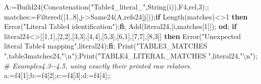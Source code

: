 \documentclass[
  10pt,
  letterpaper,
]{article}
\newenvironment{Shaded}{}{}
\newcommand{\BuiltInTok}[1]{\textcolor[rgb]{0.00,0.50,0.00}{#1}}
\newcommand{\CommentTok}[1]{\textcolor[rgb]{0.38,0.63,0.69}{\textit{#1}}}
\newcommand{\ControlFlowTok}[1]{\textcolor[rgb]{0.00,0.44,0.13}{\textbf{#1}}}
\newcommand{\FloatTok}[1]{\textcolor[rgb]{0.25,0.63,0.44}{#1}}
\newcommand{\NormalTok}[1]{#1}
\newcommand{\OperatorTok}[1]{\textcolor[rgb]{0.40,0.40,0.40}{#1}}
\newcommand{\StringTok}[1]{\textcolor[rgb]{0.25,0.44,0.63}{#1}}
\newcommand{\VariableTok}[1]{\textcolor[rgb]{0.10,0.09,0.49}{#1}}
\begin{document}
\begin{Shaded}
\begin{Highlighting}[]
 \VariableTok{A}\OperatorTok{:=}\VariableTok{Build24}\NormalTok{(}\BuiltInTok{Concatenation}\NormalTok{(}\StringTok{"Table4\_literal\_"}\OperatorTok{,}\BuiltInTok{String}\NormalTok{(}\VariableTok{i}\NormalTok{))}\OperatorTok{,}\VariableTok{F4}\OperatorTok{,}\VariableTok{rel}\OperatorTok{,}\FloatTok{3}\NormalTok{)}\OperatorTok{;;}
 \VariableTok{matches}\OperatorTok{:=}\BuiltInTok{Filtered}\NormalTok{([}\FloatTok{1}\OperatorTok{..}\FloatTok{8}\NormalTok{]}\OperatorTok{,}\VariableTok{j}\OperatorTok{{-}\textgreater{}}\VariableTok{Same24}\NormalTok{(}\VariableTok{A}\OperatorTok{,}\VariableTok{refs24}\NormalTok{[}\VariableTok{j}\NormalTok{]))}\OperatorTok{;}\ControlFlowTok{if} \BuiltInTok{Length}\NormalTok{(}\VariableTok{matches}\NormalTok{)}\OperatorTok{\textless{}\textgreater{}}\FloatTok{1} \ControlFlowTok{then} \BuiltInTok{Error}\NormalTok{(}\StringTok{"Literal Table4 identification"}\NormalTok{)}\OperatorTok{;}\ControlFlowTok{fi}\OperatorTok{;}
 \BuiltInTok{Add}\NormalTok{(}\VariableTok{literal24}\OperatorTok{,}\NormalTok{[}\VariableTok{i}\OperatorTok{,}\VariableTok{matches}\NormalTok{[}\FloatTok{1}\NormalTok{]])}\OperatorTok{;}
\ControlFlowTok{od}\OperatorTok{;}
\ControlFlowTok{if} \VariableTok{literal24}\OperatorTok{\textless{}\textgreater{}}\NormalTok{[[}\FloatTok{1}\OperatorTok{,}\FloatTok{1}\NormalTok{]}\OperatorTok{,}\NormalTok{[}\FloatTok{2}\OperatorTok{,}\FloatTok{2}\NormalTok{]}\OperatorTok{,}\NormalTok{[}\FloatTok{3}\OperatorTok{,}\FloatTok{3}\NormalTok{]}\OperatorTok{,}\NormalTok{[}\FloatTok{4}\OperatorTok{,}\FloatTok{4}\NormalTok{]}\OperatorTok{,}\NormalTok{[}\FloatTok{5}\OperatorTok{,}\FloatTok{3}\NormalTok{]}\OperatorTok{,}\NormalTok{[}\FloatTok{6}\OperatorTok{,}\FloatTok{1}\NormalTok{]}\OperatorTok{,}\NormalTok{[}\FloatTok{7}\OperatorTok{,}\FloatTok{7}\NormalTok{]}\OperatorTok{,}\NormalTok{[}\FloatTok{8}\OperatorTok{,}\FloatTok{3}\NormalTok{]] }\ControlFlowTok{then} \BuiltInTok{Error}\NormalTok{(}\StringTok{"Unexpected literal Table4 mapping"}\OperatorTok{,}\VariableTok{literal24}\NormalTok{)}\OperatorTok{;}\ControlFlowTok{fi}\OperatorTok{;}
\BuiltInTok{Print}\NormalTok{(}\StringTok{"TABLE3\_MATCHES "}\OperatorTok{,}\VariableTok{table3matches24}\OperatorTok{,}\StringTok{"\textbackslash{}n"}\NormalTok{)}\OperatorTok{;}\BuiltInTok{Print}\NormalTok{(}\StringTok{"TABLE4\_LITERAL\_MATCHES "}\OperatorTok{,}\VariableTok{literal24}\OperatorTok{,}\StringTok{"\textbackslash{}n"}\NormalTok{)}\OperatorTok{;}
\NormalTok{\#}\CommentTok{ Examples4.3{-}{-}4.5, using exactly their printed raw relators.}
\VariableTok{a}\OperatorTok{:=}\VariableTok{f4}\NormalTok{[}\FloatTok{1}\NormalTok{]}\OperatorTok{;}\VariableTok{b}\OperatorTok{:=}\VariableTok{f4}\NormalTok{[}\FloatTok{2}\NormalTok{]}\OperatorTok{;}\VariableTok{c}\OperatorTok{:=}\VariableTok{f4}\NormalTok{[}\FloatTok{3}\NormalTok{]}\OperatorTok{;}\VariableTok{d}\OperatorTok{:=}\VariableTok{f4}\NormalTok{[}\FloatTok{4}\NormalTok{]}\OperatorTok{;;}

\end{Highlighting}
\end{Shaded}
\end{document}
